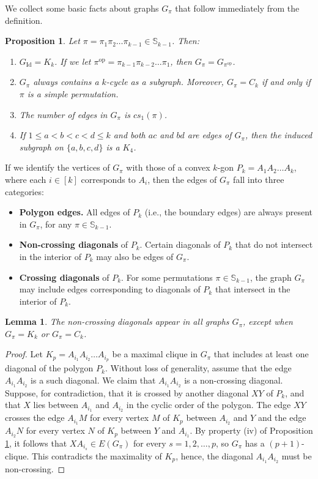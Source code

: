 \documentclass{birkjour}
\newtheorem{lem}[thm]{Lemma}
\newtheorem{prop}[thm]{Proposition}
\theoremstyle{definition}
\theoremstyle{remark}
\numberwithin{equation}{section}
\begin{document}
We collect some basic facts about graphs $G_\pi$ that follow
immediately from the definition.
\begin{prop}\label{P:propertiesofG}
Let $\pi=\pi_1\pi_2\ldots\pi_{k-1}\in \mathbb{S}_{k-1}$. Then:
\begin{enumerate}
    \item[(i)] $G_{\mathrm{Id}}=K_k$. If we let
    $\pi^{\mathrm{op}}=\pi_{k-1}\pi_{k-2}\ldots\pi_{1}$,
    then $G_\pi=G_{\pi^{\mathrm{op}}}$.
    \item[(ii)]
    $G_\pi$ always contains a $k$-cycle
    as a subgraph. Moreover,
    $G_{\pi}=C_k$ if and only if $\pi$ is a simple
    permutation.  \item[(iii)] The number of edges in $G_\pi$ is
    $cs_1(\pi)$.
    \item[(iv)]\label{F:nonintersecting} If $1\leq a<b<c<d\leq k$
    and both $ac$ and $bd$ are edges of $G_\pi$,
    then the induced subgraph on $\{a,b,c,d\}$ is a $K_4$.
\end{enumerate}
\end{prop}
If we identify the vertices of $G_\pi$ with those of a convex
$k$-gon $P_k = A_1A_2\ldots A_k$, where each $i \in [k]$
corresponds to $A_i$, then the edges of $G_\pi$ fall into three
categories:
\begin{itemize}
    \item \textbf{Polygon edges.} All edges of
    $P_k$ (i.e., the boundary edges) are always present in $G_\pi$,
    for any $\pi \in \mathbb{S}_{k-1}$.
    \item \textbf{Non-crossing diagonals} of $P_k$.
     Certain diagonals of $P_k$
    that do not intersect
    in the interior of $P_k$ may also be edges of $G_\pi$.
    \item  \textbf{Crossing diagonals} of $P_k$.
    For some permutations $\pi\in \mathbb{S}_{k-1}$, the graph
     $G_\pi$ may include edges corresponding to diagonals of $P_k$ that
     intersect in
    the interior of $P_k$.
\end{itemize}
\begin{lem}The non-crossing diagonals
    appear in all graphs $G_\pi$, except when $G_\pi=K_k$ or $G_\pi= C_k$.
\end{lem}
\begin{proof}Let $K_p = A_{i_1}A_{i_2}\ldots A_{i_p}$ be
a maximal clique in $G_\pi$ that includes at
least one diagonal of the polygon $P_k$.
 Without loss of generality, assume that the edge
 $A_{i_1}A_{i_2}$ is a such diagonal. We claim that
 $A_{i_1}A_{i_2}$ is a non-crossing diagonal.
Suppose, for contradiction, that it is crossed by another diagonal
$XY$ of $P_k$, and that $X$ lies between $A_{i_1}$ and $A_{i_2}$
in the cyclic order of the polygon. The edge $XY$ crosses the edge
$A_{i_1}M$ for every vertex $M$ of $K_p$ between $A_{i_2}$ and $Y$
and the edge $A_{i_2}N$ for every vertex $N$ of $K_p$ between $Y$
and $A_{i_1}$. By property (iv) of Proposition
\ref{P:propertiesofG}, it follows that $XA_{i_s} \in E(G_\pi)$ for
every $s = 1, 2, \ldots, p$, so $G_\pi$ has a $(p+1)$-clique. This
contradicts the maximality of $K_p$, hence, the diagonal
$A_{i_1}A_{i_2}$ must be non-crossing.
\end{proof}
\end{document}
